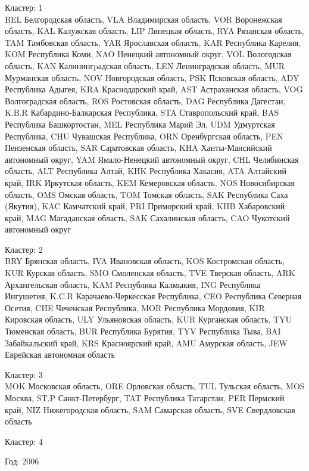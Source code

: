\documentclass[11pt]{article}
\begin{document}
Кластер:  1 \\
BEL Белгородская область, VLA Владимирская область, VOR Воронежская область, KAL Калужская область, LIP Липецкая область, RYA Рязанская область, TAM Тамбовская область, YAR Ярославская область, KAR Республика Карелия, KOM Республика Коми, NAO Ненецкий автономный округ, VOL Вологодская область, KAN Калинингpадская область, LEN Ленинградская область, MUR Мурманская область, NOV Новгородская область, PSK Псковская область, ADY Республика Адыгея, KRA Краснодарский край, AST Астраханская область, VOG Волгоградская область, ROS Ростовская область, DAG Республика Дагестан, K.B.R Кабардино-Балкарская Республика, STA Ставропольский край, BAS Республика Башкортостан, MEL Республика Марий Эл, UDM Удмуртская Республика, CHU Чувашская Республика, ORN Оренбургская область, PEN Пензенская область, SAR Саратовская область, KHA Ханты-Мансийский автономный округ, YAM Ямало-Ненецкий автономный округ, CHL Челябинская область, ALT Республика Алтай, KHK Республика Хакасия, ATA Алтайский край, IRK Иркутская область, KEM Кемеровская область, NOS Новосибирская область, OMS Омская область, TOM Томская область, SAK Республика Саха (Якутия), KAC Камчатский край, PRI Приморский край, KHB Хабаровский край, MAG Магаданская область, SAK Сахалинская область, CAO Чукотский автономный округ

Кластер:  2 \\
BRY Брянская область, IVA Ивановская область, KOS Костромская область, KUR Курская область, SMO Смоленская область, TVE Тверская область, ARK Архангельская область, KAM Республика Калмыкия, ING Республика Ингушетия, K.C.R Карачаево-Черкесская Республика, CEO Республика Северная Осетия, CHE Чеченская Республика, MOR Республика Мордовия, KIR Кировская область, ULY Ульяновская область, KUR Курганская область, TYU Тюменская область, BUR Республика Бурятия, TYV Республика Тыва, BAI Забайкальский край, KRS Красноярский край, AMU Амурская область, JEW Еврейская автономная область

Кластер:  3 \\
MOK Московская область, ORE Орловская область, TUL Тульская область, MOS Москва, ST.P Санкт-Петербург, TAT Республика Татарстан, PER Пермский край, NIZ Нижегородская область, SAM Самарская область, SVE Свердловская область

Кластер:  4 \\

\begin{center}
Год:  2006
\end{center}
\end{document}
